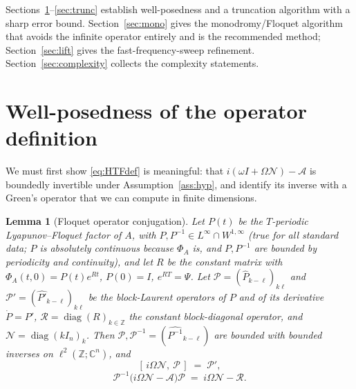 \documentclass{amsart}
\newtheorem{lemma}{Lemma}
\theoremstyle{definition}
\DeclareMathOperator{\diag}{diag}
\newcommand{\C}{\mathbb{C}}
\newcommand{\Z}{\mathbb{Z}}
\newcommand{\Acal}{\mathcal{A}}
\newcommand{\Ncal}{\mathcal{N}}
\begin{document}
Sections~\ref{sec:wellposed}--\ref{sec:trunc} establish well-posedness and a
truncation algorithm with a sharp error bound. Section~\ref{sec:mono} gives the
monodromy/Floquet algorithm that avoids the infinite operator entirely and is
the recommended method; Section~\ref{sec:lift} gives the
fast-frequency-sweep refinement. Section~\ref{sec:complexity} collects the
complexity statements.

\section{Well-posedness of the operator definition}\label{sec:wellposed}

We must first show \eqref{eq:HTFdef} is meaningful: that
$i(\omega I+\Omega\Ncal)-\Acal$ is boundedly invertible under
Assumption~\ref{ass:hyp}, and identify its inverse with a Green's operator that
we can compute in finite dimensions.

\begin{lemma}[Floquet operator conjugation]\label{lem:conj}
Let $P(t)$ be the $T$-periodic Lyapunov--Floquet factor of $A$, with
$P,P^{-1}\in L^\infty\cap W^{1,\infty}$ (true for all standard data; $P$ is
absolutely continuous because $\Phi_A$ is, and $P,P^{-1}$ are bounded by
periodicity and continuity), and let $R$ be the constant matrix with
$\Phi_A(t,0)=P(t)e^{Rt}$, $P(0)=I$, $e^{RT}=\Psi$. Let
$\mathcal P=(\hat P_{k-\ell})_{k\ell}$ and $\mathcal P'=(\widehat{P'}_{k-\ell})_{k\ell}$
be the block-Laurent operators of $P$ and of its derivative $\dot P=P'$,
$\mathcal R=\diag(R)_{k\in\Z}$ the constant block-diagonal operator, and
$\Ncal=\diag(kI_n)_{k}$. Then $\mathcal P,\mathcal P^{-1}=(\widehat{P^{-1}}_{k-\ell})$
are bounded with bounded inverses on $\ell^2(\Z;\C^n)$, and
\begin{equation}\label{eq:commNP}
[\,i\Omega\Ncal,\ \mathcal P\,]\;=\;\mathcal P',
\end{equation}
\begin{equation}\label{eq:conj}
\mathcal P^{-1}\big(i\Omega\Ncal-\Acal\big)\mathcal P
\;=\;i\Omega\Ncal-\mathcal R .
\end{equation}
\end{lemma}
\end{document}
